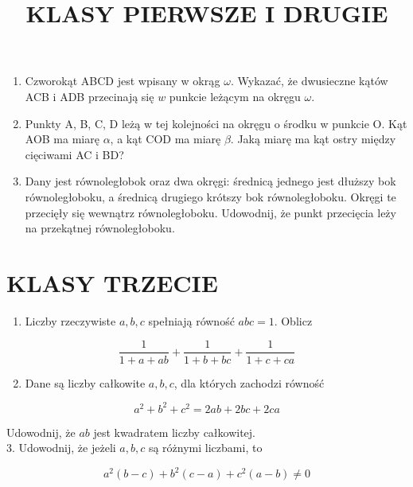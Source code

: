 \documentclass[10pt]{article}
\title{KLASY PIERWSZE I DRUGIE }
\author{}
\date{}
\begin{document}
\maketitle
\begin{enumerate}
  \item Czworokąt ABCD jest wpisany w okrąg \(\omega\). Wykazać, że dwusieczne kątów ACB i ADB przecinają się \(w\) punkcie leżącym na okręgu \(\omega\).
  \item Punkty A, B, C, D leżą w tej kolejności na okręgu o środku w punkcie O. Kąt AOB ma miarę \(\alpha\), a kąt COD ma miarę \(\beta\). Jaką miarę ma kąt ostry między cięciwami AC i BD?
  \item Dany jest równoległobok oraz dwa okręgi: średnicą jednego jest dłuższy bok równoległoboku, a średnicą drugiego krótszy bok równoległoboku. Okręgi te przecięły się wewnątrz równoległoboku. Udowodnij, że punkt przecięcia leży na przekątnej równoległoboku.
\end{enumerate}

\section*{KLASY TRZECIE}
\begin{enumerate}
  \item Liczby rzeczywiste \(a, b, c\) spełniają równość \(a b c=1\). Oblicz
\end{enumerate}

\[
\frac{1}{1+a+a b}+\frac{1}{1+b+b c}+\frac{1}{1+c+c a}
\]

\begin{enumerate}
  \setcounter{enumi}{1}
  \item Dane są liczby całkowite \(a, b, c\), dla których zachodzi równość
\end{enumerate}

\[
a^{2}+b^{2}+c^{2}=2 a b+2 b c+2 c a
\]

Udowodnij, że \(a b\) jest kwadratem liczby całkowitej.\\
3. Udowodnij, że jeżeli \(a, b, c\) są różnymi liczbami, to

\[
a^{2}(b-c)+b^{2}(c-a)+c^{2}(a-b) \neq 0
\]
\end{document}

